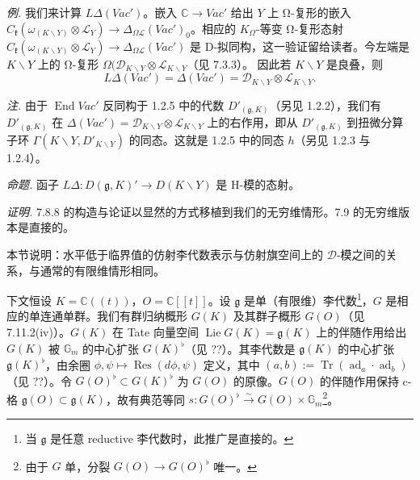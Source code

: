  \emph{例.} 我们来计算 $L\Delta(Vac')$。嵌入 $\mathbb{C}\to Vac'$ 给出 $Y$ 上 Ω-复形的嵌入 $C_{\mathfrak{k}}(\omega_{(K\backslash Y)}\otimes\mathcal{L}_Y)\to\Delta_{\Omega\mathcal{L}}(Vac')_0$。相应的 $K_{\Omega}$-等变 Ω-复形态射 $C_{\mathfrak{k}}(\omega_{(K\backslash Y)}\otimes\mathcal{L}_Y)\to\Delta_{\Omega\mathcal{L}}(Vac')$ 是 D-拟同构，这一验证留给读者。今左端是 $K\backslash Y$ 上的 Ω-复形 $\Omega(\mathcal{D}_{K\backslash Y}\otimes\mathcal{L}_{K\backslash Y}$（见 7.3.3）。%
因此若 $K\backslash Y$ 是良叠，则
\[
L\Delta(Vac')=\Delta(Vac')=\mathcal{D}_{K\backslash Y}\otimes\mathcal{L}_{K\backslash Y}.
\]

\emph{注.} 由于 $\operatorname{End}Vac'$ 反同构于 1.2.5 中的代数 $D'_{(\mathfrak{g},K)}$（另见 1.2.2），我们有 $D'_{(\mathfrak{g},K)}$ 在 $\Delta(Vac')=\mathcal{D}_{K\backslash Y}\otimes\mathcal{L}_{K\backslash Y}$ 上的右作用，即从 $D'_{(\mathfrak{g},K)}$ 到扭微分算子环 $\Gamma(K\backslash Y,D'_{K\backslash Y})$ 的同态。这就是 1.2.5 中的同态 $h$（另见 1.2.3 与 1.2.4）。

 \emph{命题.} 函子 $L\Delta:D(\mathfrak{g},K)'\to D(K\backslash Y)$ 是 H-模的态射。

\emph{证明.} 7.8.8 的构造与论证以显然的方式移植到我们的无穷维情形。7.9 的无穷维版本是直接的。


本节说明：水平低于临界值的仿射李代数表示与仿射旗空间上的 $\mathcal{D}$-模之间的关系，与通常的有限维情形相同。

 下文恒设 $K=\mathbb{C}((t))$，$O=\mathbb{C}[[t]]$。设 $\mathfrak{g}$ 是单（有限维）李代数\footnote{当 $\mathfrak{g}$ 是任意 reductive 李代数时，此推广是直接的。}，$G$ 是相应的单连通单群。我们有群归纳概形 $G(K)$ 及其群子概形 $G(O)$（见 7.11.2(iv)）。$G(K)$ 在 Tate 向量空间 $\operatorname{Lie}G(K)=\mathfrak{g}(K)$ 上的伴随作用给出 $G(K)$ 被 $\mathbb{G}_m$ 的中心扩张 $G(K)^{\flat}$（见 ??）。其李代数是 $\mathfrak{g}(K)$ 的中心扩张 $\mathfrak{g}(K)^{\flat}$，由余圈 $\phi,\psi\mapsto\operatorname{Res}(d\phi,\psi)$ 定义，其中 $(a,b):=\operatorname{Tr}(\operatorname{ad}_a\cdot\operatorname{ad}_b)$（见 ??）。令 $G(O)^{\flat}\subset G(K)^{\flat}$ 为 $G(O)$ 的原像。$G(O)$ 的伴随作用保持 c-格 $\mathfrak{g}(O)\subset\mathfrak{g}(K)$，故有典范等同 $s:G(O)^{\flat}\xrightarrow{\sim}G(O)\times\mathbb{G}_m$\footnote{由于 $G$ 单，分裂 $G(O)\to G(O)^{\flat}$ 唯一。}。%


